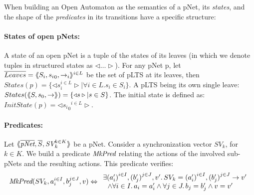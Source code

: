 \documentclass{lncs/llncs}
\newcommand{\TODO}[1]{\textcolor{red}{\textbf{[TODO:#1]}}}
\newcommand{\MkPred}{\symb{MkPred}}
\begin{document}
%

When building an Open Automaton as the semantics of a pNet, its
\emph{states}, and the shape of the \emph{predicates} in its
transitions have a specific structure:

\paragraph{States of open pNets:}\label{def-states}
  A state of an open pNet is a tuple of the
  states of its leaves (in which we denote tuples
  in structured states as $\triangleleft\ldots\triangleright$).
  For any pNet p, let $\overline{Leaves} = \langle\hspace{-0.58ex}\langle S_i,{s_i}_0, \to_i\rangle\hspace{-0.58ex}\rangle^{i \in L}$ be the set of pLTS at its leaves,
  then $States(p) = \{\triangleleft s_i^{i\in L}
  \triangleright| \forall i\in L. s_i \in S_i\}$.
A pLTS being its own single leave:
  $States(\langle\hspace{-0.58ex}\langle S,s_0, \to\rangle\hspace{-0.58ex}\rangle) = \{\triangleleft s \triangleright| s \in S\}$.
The initial state is defined as:
$InitState(p) = \triangleleft {{s_i}_0}^{i\in L}  \triangleright$.



\paragraph{Predicates:}
Let
$\mylangle\overline{\pNet},\overline{S},\symb{SV}_k^{k\in K} \myrangle$
be a pNet. Consider a synchronization vector $SV_k$, for $k\in K$. We build a
predicate $\MkPred$ relating
the actions of the involved sub-pNets and the resulting actions. This predicate verifies:
\[\MkPred(SV_k, a_i^{i\in I}, b_j^{j\in J}, v)\Leftrightarrow
\begin{array}{l}
\exists {(a'_i)}^{i\in I},
{(b'_j)}^{j\in J},v'.\, SV_k={(a'_i)}^{i\in I}, {(b'_j)}^{j\in J}\rightarrow v'
\\~~\land
\forall i\in I.\, a_i=a'_i\land \forall j \in J.\, b_j=b'_j \land v=v'
\end{array}\]
\end{document}
